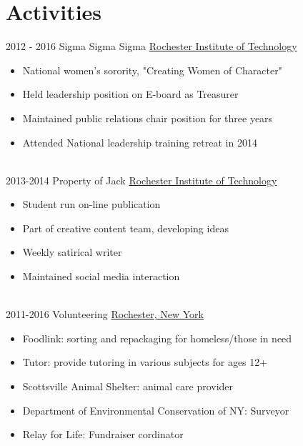 \documentclass[letterpaper]{twentysecondcv} %
\begin{document}
\section{Activities}
\begin{twenty}
	\twentyitem
    	{2012 - 2016}
        {Sigma Sigma Sigma}
        {\href{https://www.rit.edu/studentaffairs/greek/college-panhellenic-council/chapters/sigma-sigma-sigma}{Rochester Institute of Technology}}
        {}
        {
        {\begin{itemize}
        \item National women's sorority, "Creating Women of Character" 
        \item Held leadership position on E-board as Treasurer
        \item Maintained public relations chair position for three years
        \item Attended National leadership training retreat in 2014
    \end{itemize}}
        }
\\
        
    \twentyitem
    	{2013-2014}
        {Property of Jack}
        {\href{}{Rochester Institute of Technology}}
        {}
        {
        {\begin{itemize}
        \item Student run on-line publication  
        \item Part of creative content team, developing ideas
        \item Weekly satirical writer
        \item Maintained social media interaction 
    \end{itemize}}
        }
\\        
        \twentyitem
    	{2011-2016}
        {Volunteering}
        {\href{}{Rochester, New York}}
        {}
        {
        {\begin{itemize}
        \item Foodlink: sorting and repackaging for homeless/those in need  
        \item Tutor: provide tutoring in various subjects for ages 12+
        \item Scottsville Animal Shelter: animal care provider
        \item Department of Environmental Conservation of NY: Surveyor
        \item Relay for Life: Fundraiser cordinator 
    \end{itemize}}
        }
\end{twenty}
\end{document}
